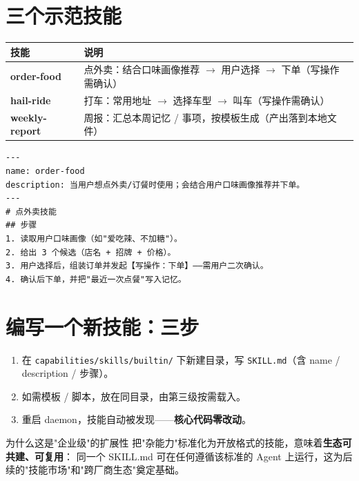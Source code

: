 \section{三个示范技能}
\begin{center}
\small
\begin{tabularx}{\linewidth}{>{\bfseries\ttfamily}p{2.6cm} X}
\toprule
技能 & 说明 \\
\midrule
order-food & 点外卖：结合口味画像推荐 $\to$ 用户选择 $\to$ 下单（写操作需确认） \\
hail-ride & 打车：常用地址 $\to$ 选择车型 $\to$ 叫车（写操作需确认） \\
weekly-report & 周报：汇总本周记忆 / 事项，按模板生成（产出落到本地文件） \\
\bottomrule
\end{tabularx}
\end{center}

\begin{lstlisting}[caption={SKILL.md 样例（order-food）},captionpos=b]
---
name: order-food
description: 当用户想点外卖/订餐时使用；会结合用户口味画像推荐并下单。
---
# 点外卖技能
## 步骤
1. 读取用户口味画像（如"爱吃辣、不加糖"）。
2. 给出 3 个候选（店名 + 招牌 + 价格）。
3. 用户选择后，组装订单并发起【写操作：下单】——需用户二次确认。
4. 确认后下单，并把"最近一次点餐"写入记忆。
\end{lstlisting}

\section{编写一个新技能：三步}
\begin{enumerate}[leftmargin=1.6em]
  \item 在 \texttt{capabilities/skills/builtin/} 下新建目录，写 \texttt{SKILL.md}（含 name / description / 步骤）。
  \item 如需模板 / 脚本，放在同目录，由第三级按需载入。
  \item 重启 daemon，技能自动被发现——\textbf{核心代码零改动}。
\end{enumerate}

\begin{keybox}{为什么这是"企业级"的扩展性}
把"杂能力"标准化为开放格式的技能，意味着\textbf{生态可共建、可复用}：
同一个 SKILL.md 可在任何遵循该标准的 Agent 上运行，这为后续的"技能市场"和"跨厂商生态"奠定基础。
\end{keybox}
